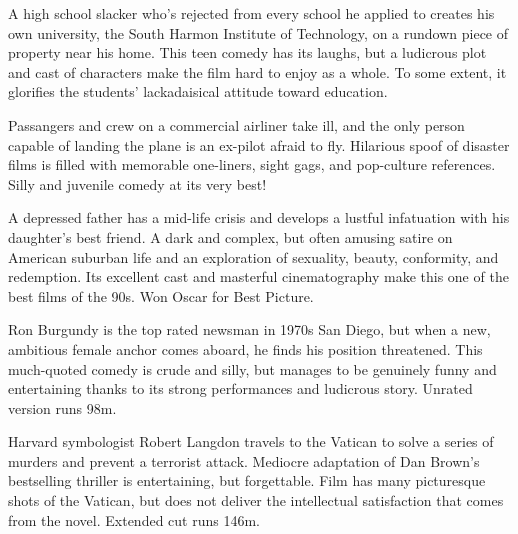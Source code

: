    A high school slacker who's rejected from every school he applied to creates his own university, the South Harmon Institute of Technology, on a rundown piece of property near his home. This teen comedy has its laughs, but a ludicrous plot and cast of characters make the film hard to enjoy as a whole. To some extent, it glorifies the students' lackadaisical attitude toward education. \author{DW} 

   Passangers and crew on a commercial airliner take ill, and the only person capable of landing the plane is an ex-pilot afraid to fly. Hilarious spoof of disaster films is filled with memorable one-liners, sight gags, and pop-culture references. Silly and juvenile comedy at its very best! \author{DW} 

\iffalse
\movie{Am\'{e}lie}{2001}{122m}{\threehalf} \dir{Jean-Pierre Jeunet}
\fi

   A depressed father has a mid-life crisis and develops a lustful infatuation with his daughter's best friend. A dark and complex, but often amusing satire on American suburban life and an exploration of sexuality, beauty, conformity, and redemption. Its excellent cast and masterful cinematography make this one of the best films of the 90s. Won Oscar for Best Picture. \author{DW} 

   Ron Burgundy is the top rated newsman in 1970s San Diego, but when a new, ambitious female anchor comes aboard, he finds his position threatened. This much-quoted comedy is crude and silly, but manages to be genuinely funny and entertaining thanks to its strong performances and ludicrous story. Unrated version runs 98m. \author{DW} 

   Harvard symbologist Robert Langdon travels to the Vatican to solve a series of murders and prevent a terrorist attack. Mediocre adaptation of Dan Brown's bestselling thriller is entertaining, but forgettable. Film has many picturesque shots of the Vatican, but does not deliver the intellectual satisfaction that comes from the novel. Extended cut runs 146m. \author{DW} 

